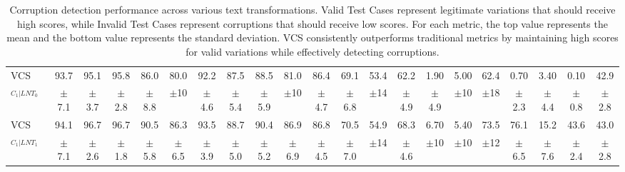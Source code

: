 \documentclass[main.tex]{subfiles}
\begin{document}
\begin{table}[t]
{\begin{tabular}{l|cccccccccc@{\hskip 2pt}|cccccccccc}
\multirow{2}{*}{VCS$_{C_1|LNT_0}$} & {\normalsize 93.7} & {\normalsize 95.1} & {\normalsize 95.8} & {\normalsize 86.0} & {\normalsize 80.0} & {\normalsize 92.2} & {\normalsize 87.5} & {\normalsize 88.5} & {\normalsize 81.0} & {\normalsize 86.4} & {\normalsize 69.1} & {\normalsize 53.4} & {\normalsize 62.2} & {\normalsize 1.90} & {\normalsize 5.00} & {\normalsize 62.4} & {\normalsize 0.70} & {\normalsize 3.40} & {\normalsize 0.10} & {\normalsize 42.9} \\
& {\footnotesize $\pm$7.1} & {\footnotesize $\pm$3.7} & {\footnotesize $\pm$2.8} & {\footnotesize $\pm$8.8} & {\footnotesize $\pm$10} & {\footnotesize $\pm$4.6} & {\footnotesize $\pm$5.4} & {\footnotesize $\pm$5.9} & {\footnotesize $\pm$10} & {\footnotesize $\pm$4.7} & {\footnotesize $\pm$6.8} & {\footnotesize $\pm$14} & {\footnotesize $\pm$4.9} & {\footnotesize $\pm$4.9} & {\footnotesize $\pm$10} & {\footnotesize $\pm$18} & {\footnotesize $\pm$2.3} & {\footnotesize $\pm$4.4} & {\footnotesize $\pm$0.8} & {\footnotesize $\pm$2.8} \\
\cline{2-21}

\multirow{2}{*}{VCS$_{C_1|LNT_1}$} & {\normalsize 94.1} & {\normalsize 96.7} & {\normalsize 96.7} & {\normalsize 90.5} & {\normalsize 86.3} & {\normalsize 93.5} & {\normalsize 88.7} & {\normalsize 90.4} & {\normalsize 86.9} & {\normalsize 86.8} & {\normalsize 70.5} & {\normalsize 54.9} & {\normalsize 68.3} & {\normalsize 6.70} & {\normalsize 5.40} & {\normalsize 73.5} & {\normalsize 76.1} & {\normalsize 15.2} & {\normalsize 43.6} & {\normalsize 43.0} \\
& {\footnotesize $\pm$7.1} & {\footnotesize $\pm$2.6} & {\footnotesize $\pm$1.8} & {\footnotesize $\pm$5.8} & {\footnotesize $\pm$6.5} & {\footnotesize $\pm$3.9} & {\footnotesize $\pm$5.0} & {\footnotesize $\pm$5.2} & {\footnotesize $\pm$6.9} & {\footnotesize $\pm$4.5} & {\footnotesize $\pm$7.0} & {\footnotesize $\pm$14} & {\footnotesize $\pm$4.6} & {\footnotesize $\pm$10} & {\footnotesize $\pm$10} & {\footnotesize $\pm$12} & {\footnotesize $\pm$6.5} & {\footnotesize $\pm$7.6} & {\footnotesize $\pm$2.4} & {\footnotesize $\pm$2.8} \\
\hline
\end{tabular}
}
\caption{Corruption detection performance across various text transformations. Valid Test Cases represent legitimate variations that should receive high scores, while Invalid Test Cases represent corruptions that should receive low scores. For each metric, the top value represents the mean and the bottom value represents the standard deviation. VCS consistently outperforms traditional metrics by maintaining high scores for valid variations while effectively detecting corruptions.}
\label{tab:corruption-results}
\end{table}
\end{document}
